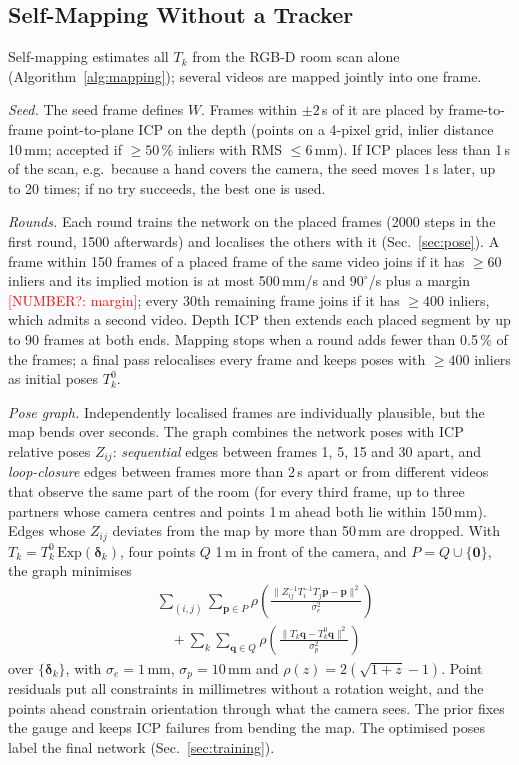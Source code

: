 \documentclass[journal]{IEEEtran}
\newcommand{\NUMQ}[1]{\textcolor{red}{[NUMBER?: #1]}}
\begin{document}
\subsection{Self-Mapping Without a Tracker}
\label{sec:mapping}
Self-mapping estimates all $T_k$ from the RGB-D room scan alone (Algorithm~\ref{alg:mapping}); several videos are mapped jointly into one frame.

\emph{Seed.} The seed frame defines $W$. Frames within $\pm2$\,s of it are placed by frame-to-frame point-to-plane ICP on the depth \cite{chen1992icp,TODO-low2004} (points on a 4-pixel grid, inlier distance 10\,mm; accepted if $\ge50$\,\% inliers with RMS $\le6$\,mm). If ICP places less than 1\,s of the scan, e.g.\ because a hand covers the camera, the seed moves 1\,s later, up to 20 times; if no try succeeds, the best one is used.

\emph{Rounds.} Each round trains the network on the placed frames (2000 steps in the first round, 1500 afterwards) and localises the others with it (Sec.~\ref{sec:pose}). A frame within 150 frames of a placed frame of the same video joins if it has $\ge60$ inliers and its implied motion is at most 500\,mm/s and $90^\circ$/s plus a margin \NUMQ{margin}; every 30th remaining frame joins if it has $\ge400$ inliers, which admits a second video. Depth ICP then extends each placed segment by up to 90 frames at both ends. Mapping stops when a round adds fewer than 0.5\,\% of the frames; a final pass relocalises every frame and keeps poses with $\ge400$ inliers as initial poses $T^0_k$.

\emph{Pose graph.} Independently localised frames are individually plausible, but the map bends over seconds. The graph combines the network poses with ICP relative poses $Z_{ij}$: \emph{sequential} edges between frames 1, 5, 15 and 30 apart, and \emph{loop-closure} edges between frames more than 2\,s apart or from different videos that observe the same part of the room (for every third frame, up to three partners whose camera centres and points 1\,m ahead both lie within 150\,mm). Edges whose $Z_{ij}$ deviates from the map by more than 50\,mm are dropped. With $T_k=T^0_k\,\mathrm{Exp}(\boldsymbol{\delta}_k)$, four points $Q$ 1\,m in front of the camera, and $P=Q\cup\{\mathbf{0}\}$, the graph minimises
\begin{equation}
  \begin{aligned}
  &\sum_{(i,j)}\sum_{\mathbf{p}\in P}\rho\!\left(\frac{\|Z_{ij}^{-1}T_i^{-1}T_j\mathbf{p}-\mathbf{p}\|^2}{\sigma_e^2}\right)\\
  &\quad+\sum_{k}\sum_{\mathbf{q}\in Q}\rho\!\left(\frac{\|T_k\mathbf{q}-T^0_k\mathbf{q}\|^2}{\sigma_p^2}\right)
  \end{aligned}
  \label{eq:posegraph}
\end{equation}
over $\{\boldsymbol{\delta}_k\}$, with $\sigma_e=1$\,mm, $\sigma_p=10$\,mm and $\rho(z)=2(\sqrt{1+z}-1)$. Point residuals put all constraints in millimetres without a rotation weight, and the points ahead constrain orientation through what the camera sees. The prior fixes the gauge and keeps ICP failures from bending the map. The optimised poses label the final network (Sec.~\ref{sec:training}).
\end{document}
